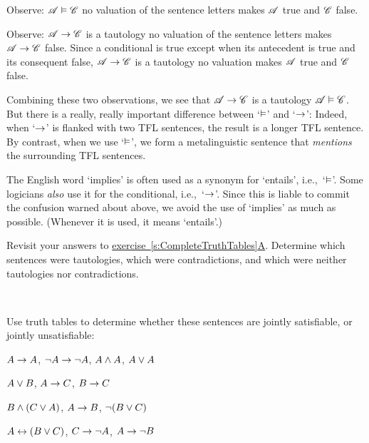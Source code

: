Observe: $\mathscr{A} \vDash \mathscr{C}$ \ifeff{} no valuation of the sentence letters makes $\mathscr{A}$ true and $\mathscr{C}$ false.

Observe: $\mathscr{A} \rightarrow \mathscr{C}$ is a tautology \ifeff{} no valuation of the sentence letters makes $\mathscr{A} \rightarrow \mathscr{C}$ false. Since a conditional is true except when its antecedent is true and its consequent false, $\mathscr{A} \rightarrow \mathscr{C}$ is a tautology \ifeff{} no valuation makes $\mathscr{A}$ true and $\mathscr{C}$ false.

Combining these two observations, we see that $\mathscr{A} \rightarrow \mathscr{C}$  is a tautology \ifeff{}  $\mathscr{A} \vDash \mathscr{C}$. But there is a really, really important difference between `$\vDash$' and `$\rightarrow$':
Indeed, when `$\rightarrow$' is flanked with two TFL sentences, the result is a longer TFL sentence. By contrast, when we use `$\vDash$', we form a metalinguistic sentence that \emph{mentions} the surrounding TFL sentences.

The English word `implies' is often used as a synonym for `entails',
i.e.,~`$\vDash$'. Some logicians \emph{also} use it for the
conditional, i.e.,~`$\rightarrow$'. Since this is liable to commit the
confusion warned about above, we avoid the use of `implies' as much as
possible. (Whenever it is used, it means `entails'.)


\practiceproblems
\problempart
Revisit your answers to
\hyperref[pr.TT.TTorC]{exercise~\ref*{s:CompleteTruthTables}A}. Determine which
sentences were tautologies, which were contradictions, and which were
neither tautologies nor contradictions.
\solutions

\

\problempart
\label{pr.TT.satisfiable}
Use truth tables to determine whether these sentences are jointly satisfiable, or jointly unsatisfiable:
\begin{compactlist}
\item $A\rightarrow A$, $\neg A \rightarrow \neg A$, $A\wedge A$, $A\vee A$ %
\item $A\vee B$, $A\rightarrow C$, $B\rightarrow C$ %
\item $B\wedge(C\vee A)$, $A\rightarrow B$, $\neg(B\vee C)$  %
\item $A\leftrightarrow(B\vee C)$, $C\rightarrow \neg A$, $A\rightarrow \neg B$ %
\end{compactlist}


